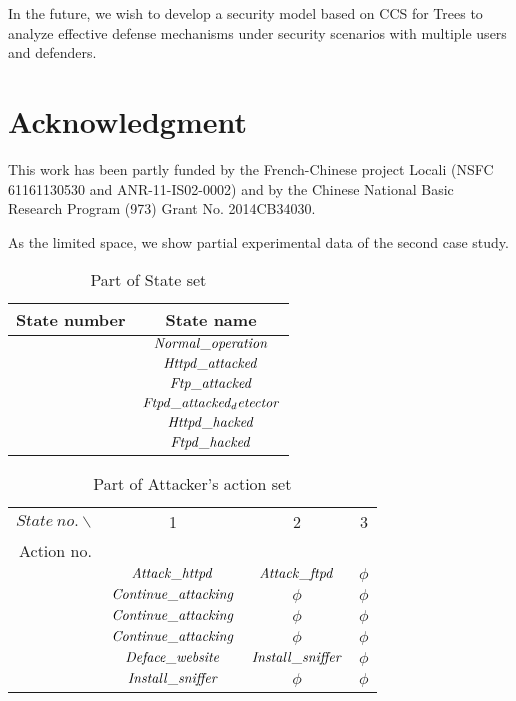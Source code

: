 \documentclass[10pt, conference, compsocconf]{IEEEtran}
\begin{document}
In the future, we wish to develop a security model based on CCS for Trees \cite{thomas} to analyze effective defense mechanisms under security scenarios with multiple users and defenders.
\section*{Acknowledgment}
This work has been partly funded by the French-Chinese project Locali (NSFC 61161130530 and ANR-11-IS02-0002) and by the Chinese National Basic Research Program (973) Grant No. 2014CB34030.







\appendix

As the limited space, we show partial experimental data of the second case study.
\begin{table}[h]
\scriptsize
\centering
\caption{\label{state}Part of State set}
\newcommand{\Rown}{\stepcounter{Rownumber}\theRownumber}
\begin{tabular}{cc}\hline
State number & State name\\\hline
\Rown        & ${\it Normal\_operation}$\\
\Rown        & ${\it Httpd\_attacked}$\\
\Rown        & ${\it Ftp\_attacked}$\\
\Rown        & ${\it Ftpd\_attacked_detector}$\\
\Rown        & ${\it Httpd\_hacked}$\\
\Rown        & ${\it Ftpd\_hacked}$\\
\hline
\end{tabular}
\end{table}

\begin{table}[h]
\scriptsize
\centering
\caption{\label{attckeraction} Part of Attacker's action set}
\newcommand{\Rownb}{\stepcounter{Rownumberb}\theRownumberb}
\begin{tabular}{cccc}\hline
$State~no.\backslash$  &  1      &  2       & 3         \\
Action no.             &         &          &           \\\hline
\Rownb             &${\it Attack\_httpd}$ &${\it Attack\_ftpd}$ &$\phi$\\
\Rownb             &${\it Continue\_attacking}$  &$\phi$ &  $\phi$\\
\Rownb             &${\it Continue\_attacking}$  &$\phi$ &  $\phi$\\
\Rownb             &${\it Continue\_attacking}$  &$\phi$ &  $\phi$\\
\Rownb       &${\it Deface\_website}$  &${\it Install\_sniffer}$&$\phi$\\
\Rownb       &${\it Install\_sniffer}$ &$\phi$     &   $\phi$\\
\hline
\end{tabular}
\end{table}
\end{document}

